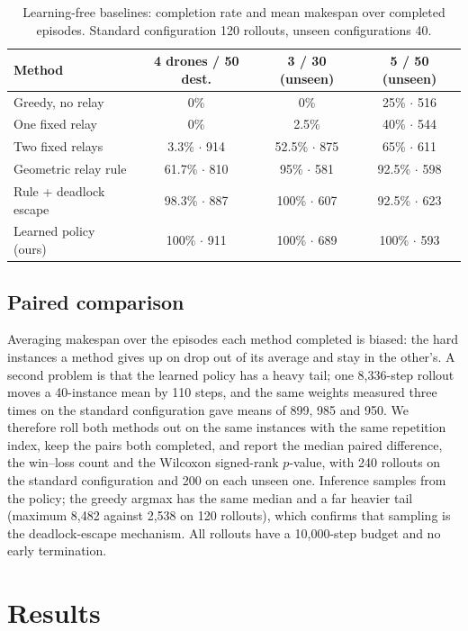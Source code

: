 \documentclass[12pt]{article}
\begin{document}
\begin{table}[h]
\centering
\caption{Learning-free baselines: completion rate and mean makespan over completed episodes.
Standard configuration 120 rollouts, unseen configurations 40.}
\label{tab:base}
\begin{tabular}{lccc}
\toprule
Method & 4 drones / 50 dest. & 3 / 30 (unseen) & 5 / 50 (unseen) \\
\midrule
Greedy, no relay & 0\% & 0\% & 25\% $\cdot$ 516 \\
One fixed relay & 0\% & 2.5\% & 40\% $\cdot$ 544 \\
Two fixed relays & 3.3\% $\cdot$ 914 & 52.5\% $\cdot$ 875 & 65\% $\cdot$ 611 \\
Geometric relay rule & 61.7\% $\cdot$ 810 & 95\% $\cdot$ 581 & 92.5\% $\cdot$ 598 \\
Rule + deadlock escape & 98.3\% $\cdot$ 887 & 100\% $\cdot$ 607 & 92.5\% $\cdot$ 623 \\
Learned policy (ours) & 100\% $\cdot$ 911 & 100\% $\cdot$ 689 & 100\% $\cdot$ 593 \\
\bottomrule
\end{tabular}
\end{table}

\subsection{Paired comparison}

Averaging makespan over the episodes each method completed is biased: the hard instances a
method gives up on drop out of its average and stay in the other's. A second problem is that
the learned policy has a heavy tail; one 8{,}336-step rollout moves a 40-instance mean by 110
steps, and the same weights measured three times on the standard configuration gave means of
899, 985 and 950. We therefore roll both methods out on the same instances with the same
repetition index, keep the pairs both completed, and report the median paired difference, the
win--loss count and the Wilcoxon signed-rank $p$-value, with 240 rollouts on the standard
configuration and 200 on each unseen one. Inference samples from the policy; the greedy argmax
has the same median and a far heavier tail (maximum 8{,}482 against 2{,}538 on 120 rollouts),
which confirms that sampling is the deadlock-escape mechanism. All rollouts have a 10{,}000-step
budget and no early termination.

\section{Results}
\end{document}
